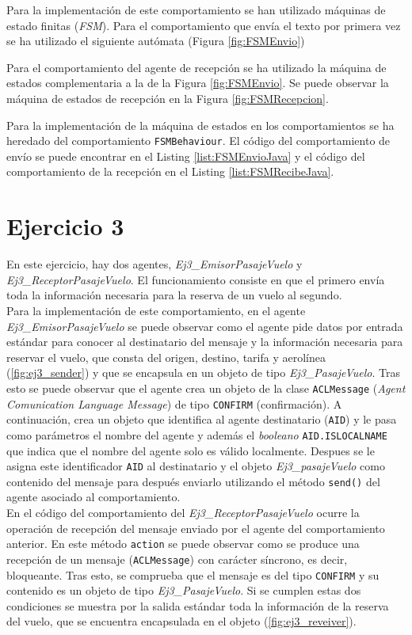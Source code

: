 \documentclass[10pt,a4paper]{article}
\begin{document}
Para la implementación de este comportamiento se han utilizado máquinas de estado finitas (\emph{FSM}). Para el comportamiento que envía el texto por primera vez se ha utilizado el siguiente autómata (Figura \ref{fig:FSMEnvio})

Para el comportamiento del agente de recepción se ha utilizado la máquina de estados complementaria a la de la Figura \ref{fig:FSMEnvio}. Se puede observar la máquina de estados de recepción en la Figura \ref{fig:FSMRecepcion}.

Para la implementación de la máquina de estados en los comportamientos se ha heredado del comportamiento \texttt{FSMBehaviour}. El código del comportamiento de envío se puede encontrar en el Listing \ref{list:FSMEnvioJava} y el código del comportamiento de la recepción en el Listing \ref{list:FSMRecibeJava}.


\section{Ejercicio 3}

En este ejercicio, hay dos agentes, \emph{Ej3\_EmisorPasajeVuelo} y \emph{Ej3\_ReceptorPasajeVuelo}. El funcionamiento consiste en que el primero envía toda la información necesaria para la reserva de un vuelo al segundo.\\

Para la implementación de este comportamiento, en el agente \emph{Ej3\_EmisorPasajeVuelo} se puede observar como el agente pide datos por entrada estándar para conocer al destinatario del mensaje y la información necesaria para reservar el vuelo, que consta del origen, destino, tarifa y aerolínea (\ref{fig:ej3_sender}) y que se encapsula en un objeto de tipo \emph{Ej3\_PasajeVuelo}. Tras esto se puede observar que el agente crea un objeto de la clase \texttt{ACLMessage} (\emph{Agent Comunication Language Message}) de tipo \texttt{CONFIRM} (confirmación). A continuación, crea un objeto que identifica al agente destinatario (\texttt{AID}) y le pasa como parámetros el nombre del agente y además el \emph{booleano} \texttt{AID.ISLOCALNAME} que indica que el nombre del agente solo es válido localmente. Despues se le asigna este identificador \texttt{AID} al destinatario y el objeto \emph{Ej3\_pasajeVuelo} como contenido del mensaje para después enviarlo utilizando el método \texttt{send()} del agente asociado al comportamiento.\\

En el código del comportamiento del \emph{Ej3\_ReceptorPasajeVuelo} ocurre la operación de recepción del mensaje enviado por el agente del comportamiento anterior. En este método \texttt{action} se puede observar como se produce una recepción de un mensaje (\texttt{ACLMessage}) con carácter síncrono, es decir, bloqueante. Tras esto, se comprueba que el mensaje es del tipo \texttt{CONFIRM} y su contenido es un objeto de tipo \emph{Ej3\_PasajeVuelo}. Si se cumplen estas dos condiciones se muestra por la salida estándar toda la información de la reserva del vuelo, que se encuentra encapsulada en el objeto (\ref{fig:ej3_reveiver}). 
\end{document}
